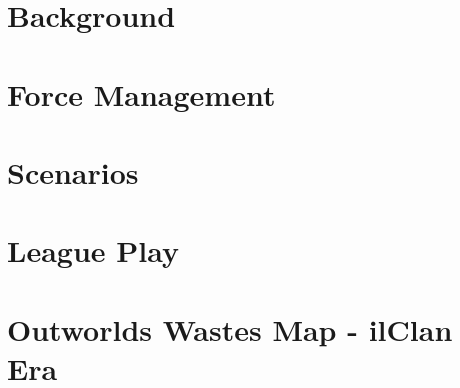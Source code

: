 \documentclass{article}
\begin{document}
\newpage

\section{Background}



\section{Force Management}



\newpage

\section{Scenarios}



\newpage

\section{League Play}



\newpage

\section{Outworlds Wastes Map - ilClan Era}



\newpage

\end{document}
